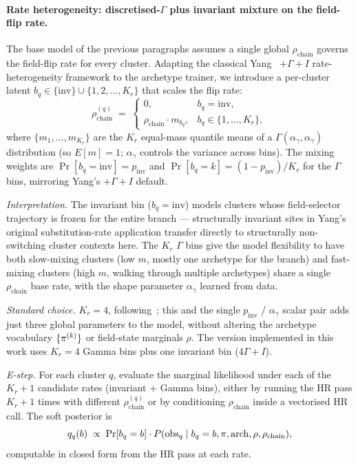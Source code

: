 \paragraph{Rate heterogeneity: discretised-$\Gamma$ plus invariant mixture on
the field-flip rate.}
\label{par:arch-gamma-plus-I}
The base model of the previous paragraphs assumes a single global
$\rho_{\text{chain}}$ governs the field-flip rate for every cluster.
Adapting the classical Yang~\citep{yang1994maximum, yang1996among}
$+\Gamma+I$ rate-heterogeneity framework to the archetype trainer, we
introduce a per-cluster latent
$b_q \in \{\mathrm{inv}\} \cup \{1, 2, \dots, K_r\}$
that scales the flip rate:
\begin{equation}
  \rho^{(q)}_{\text{chain}} \;=\;
    \begin{cases}
      0, & b_q = \mathrm{inv},\\
      \rho_{\text{chain}} \cdot m_{b_q}, & b_q \in \{1, \dots, K_r\},
    \end{cases}
  \label{eq:arch-rate-het}
\end{equation}
where $\{m_1, \dots, m_{K_r}\}$ are the $K_r$ equal-mass quantile means
of a $\Gamma(\alpha_\gamma, \alpha_\gamma)$ distribution
(so $E[m] = 1$; $\alpha_\gamma$ controls the variance across bins). The
mixing weights are $\Pr[b_q = \mathrm{inv}] = p_{\text{inv}}$ and
$\Pr[b_q = k] = (1 - p_{\text{inv}})/K_r$ for the $\Gamma$ bins,
mirroring Yang's $+\Gamma+I$ default.

\emph{Interpretation.} The invariant bin ($b_q = \mathrm{inv}$) models
clusters whose field-selector trajectory is frozen for the entire
branch --- structurally invariant sites in Yang's original
substitution-rate application transfer directly to structurally
non-switching cluster contexts here. The $K_r$ $\Gamma$ bins give the
model flexibility to have both slow-mixing clusters (low $m$, mostly
one archetype for the branch) and fast-mixing clusters (high $m$,
walking through multiple archetypes) share a single $\rho_{\text{chain}}$
base rate, with the shape parameter $\alpha_\gamma$ learned from data.

\emph{Standard choice.} $K_r = 4$, following~\citet{yang1996among};
this and the single $p_{\text{inv}}$ / $\alpha_\gamma$ scalar pair adds
just three global parameters to the model, without altering the
archetype vocabulary $\{\pi^{(k)}\}$ or field-state marginals $\rho$.
The version implemented in this work uses $K_r = 4$ Gamma bins plus one
invariant bin ($4\Gamma+I$).

\emph{E-step.} For each cluster $q$, evaluate the marginal likelihood
under each of the $K_r + 1$ candidate rates (invariant + Gamma bins),
either by running the HR pass $K_r + 1$ times with different
$\rho^{(q)}_{\text{chain}}$ or by conditioning $\rho_{\text{chain}}$
inside a vectorised HR call. The soft posterior is
\begin{equation}
  q_q(b) \;\propto\; \Pr[b_q = b] \cdot P(\text{obs}_q \mid b_q = b,
    \pi, \mathrm{arch}, \rho, \rho_{\text{chain}}),
  \label{eq:arch-rate-Estep}
\end{equation}
computable in closed form from the HR pass at each rate.

